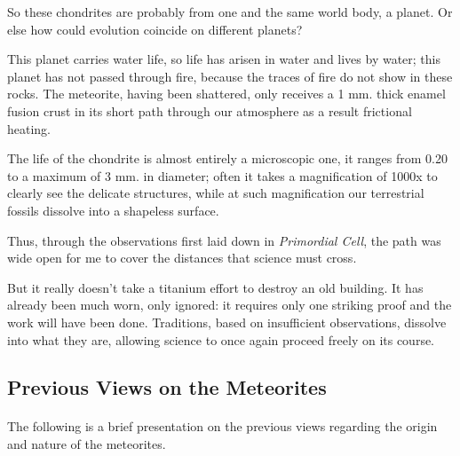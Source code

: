 \documentclass[a4paper, 12pt, oneside]{article}
\begin{document}
So these chondrites are probably from one and the same world body, a planet. Or else how could evolution coincide on different planets?

This planet carries water life, so life has arisen in water and lives by water; this planet has not passed through fire, because the traces of fire do not show in these rocks. The meteorite, having been shattered, only receives a 1 mm. thick enamel fusion crust in its short path through our atmosphere as a result frictional heating.

The life of the chondrite is almost entirely a microscopic one, it ranges from 0.20 to a maximum of 3 mm. in diameter; often it takes a magnification of 1000x to clearly see the delicate structures, while at such magnification our terrestrial fossils dissolve into a shapeless surface.

Thus, through the observations first laid down in \emph{Primordial Cell}, the path was wide open for me to cover the distances that science must cross.

But it really doesn't take a titanium effort to destroy an old building. It has already been much worn, only ignored: it requires only one striking proof and the work will have been done. Traditions, based on insufficient observations, dissolve into what they are, allowing science to once again proceed freely on its course.
\clearpage
\subsection{Previous Views on the Meteorites}
\paragraph*{}
The following is a brief presentation on the previous views regarding the origin and nature of the meteorites.
\end{document}
